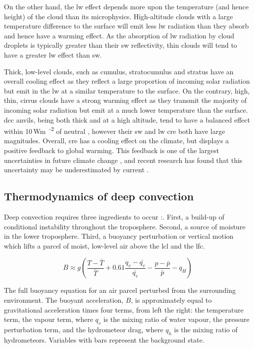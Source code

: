 On the other hand, the \acrshort{lw} effect depends more upon the temperature (and hence height) of the cloud than its microphysics.
High-altitude clouds with a large temperature difference to the surface will emit less \acrshort{lw} radiation than they absorb and hence have a warming effect.
As the absorption of \acrshort{lw} radiation by cloud droplets is typically greater than their \acrshort{sw} reflectivity, thin clouds will tend to have a greater \acrshort{lw} effect than \acrshort{sw}.

Thick, low-level clouds, such as cumulus, stratocumulus and stratus have an overall cooling effect as they reflect a large proportion of incoming solar radiation but emit in the \acrshort{lw} at a similar temperature to the surface. 
On the contrary, high, thin, cirrus clouds have a strong warming effect as they transmit the majority of incoming solar radiation but emit at a much lower temperature than the surface. 
\acrshort{dcc} anvils, being both thick and at a high altitude, tend to have a balanced effect within 10\,\unit{Wm\textsuperscript{-2}} of neutral \citep{ramanathan_cloud-radiative_1989, hartmann_effect_1992, hartmann_tropical_2016}, however their \acrshort{sw} and \acrshort{lw} \acrshort{cre} both have large magnitudes. Overall, \acrshort{cre} has a cooling effect on the climate, but displays a positive feedback to global warming. This feedback is one of the largest uncertainties in future climate change \citep{sherwood_assessment_2020}, and recent research has found that this uncertainty may be underestimated by current  \citep{hill_climate_2023}.


\subsection{Thermodynamics of deep convection}

Deep convection requires three ingredients to occur \citep{brooks_century_2019}:. 
First, a build-up of conditional instability throughout the troposphere. 
Second, a source of moisture in the lower troposphere. 
Third, a buoyancy perturbation or vertical motion which lifts a parcel of moist, low-level air above the \acrfull{lcl} and the \acrfull{lfc}.

\begin{eqfloat}
    \begin{equation}
    \label{eq:full_bouyancy}
        B \approx g \left ( \frac{T - \bar{T}}{\bar{T}} + 0.61 \frac{q_v - \bar{q_v}}{\bar{q_v}} - \frac{p - \bar{p}}{\bar{p}} - q_H \right )
    \end{equation}
    \caption{The full buoyancy equation for an air parcel perturbed from the surrounding environment. The buoyant acceleration, $B$, is approximately equal to gravitational acceleration times four terms, from left the right: the temperature term, the vapour term, where $q_v$ is the mixing ratio of water vapour, the pressure perturbation term, and the hydrometeor drag, where $q_h$ is the mixing ratio of hydrometeors. Variables with bars represent the background state.}
\end{eqfloat}

